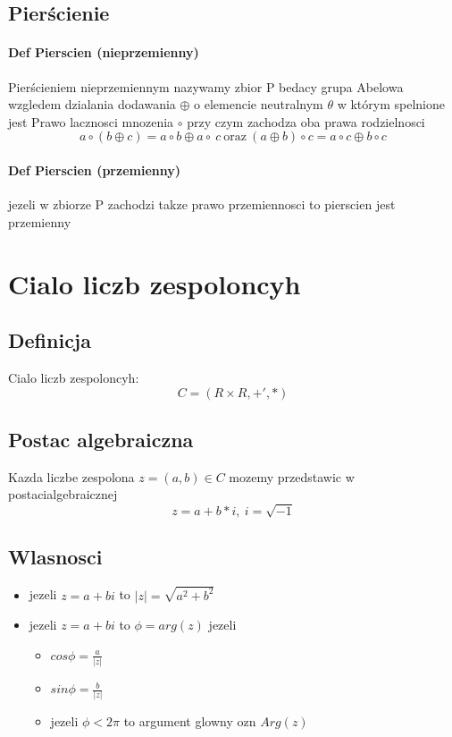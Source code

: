 \documentclass[a4paper]{article}
\begin{document}
\subsection{Pierścienie}
\paragraph{Def Pierscien (nieprzemienny)}
Pierścieniem nieprzemiennym nazywamy zbior P bedacy grupa Abelowa wzgledem dzialania dodawania $\oplus$ o elemencie neutralnym $\theta$ w którym spelnione jest Prawo lacznosci mnozenia $\circ$ przy czym zachodza oba prawa rodzielnosci
\begin{equation}
    a \circ (b \oplus c) = a \circ b \oplus a \circ \ c \ \text{oraz} \ (a \oplus b) \circ c = a \circ c \oplus b \circ c
\end{equation}
\paragraph{Def Pierscien (przemienny)}
jezeli w zbiorze P zachodzi takze prawo przemiennosci to pierscien jest przemienny
\clearpage
%
%
\section{Cialo liczb zespoloncyh}
\subsection{Definicja}
Cialo liczb zespoloncyh:
\begin{equation}
    C=(R\times R, +', * )
\end{equation}
\subsection{Postac algebraiczna}
Kazda liczbe zespolona $ z = (a,b) \in C $ mozemy przedstawic  w postacialgebraicznej
\begin{equation}
z = a + b * i , \ i = \sqrt{-1}
\end{equation}
\subsection{Wlasnosci}
\begin{itemize}
    \item jezeli $z = a+bi$ to $|z| = \sqrt{a^{2}+b^{2}}$
    \item jezeli $z = a+bi$ to $\phi = arg(z)$ jezeli \begin{itemize}
        \item $cos{\phi} = \frac{a}{|z|}$
        \item $sin{\phi} = \frac{b}{|z|}$
        \item jezeli $\phi < 2\pi$ to argument glowny ozn $Arg(z)$
    \end{itemize}
\end{itemize}
\end{document}
